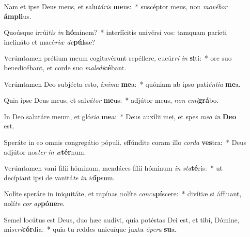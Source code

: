 \item Nam et ipse Deus meus, et salu\textit{tá}\textit{ris} \textbf{me}us:~* suscéptor meus, non \textit{mo}\textit{vé}\textit{bor} \textbf{ám}\textbf{pli}us.
\item Quoúsque irrúi\textit{tis} \textit{in} \textbf{hó}minem?~* interfícitis univérsi vos: tamquam paríeti inclináto et macé\textit{ri}\textit{æ} \textit{de}\textbf{púl}sæ?
\item Verúmtamen prétium meum cogitavérunt repéllere, cucúr\textit{ri} \textit{in} \textbf{si}ti:~* ore suo benedicébant, et corde suo \textit{ma}\textit{le}\textit{di}\textbf{cé}bant.
\item Verúmtamen Deo subjécta esto, á\textit{ni}\textit{ma} \textbf{me}a:~* quóniam ab ipso pati\textit{én}\textit{ti}\textit{a} \textbf{me}a.
\item Quia ipse Deus meus, et sal\textit{vá}\textit{tor} \textbf{me}us:~* adjútor meus, \textit{non} \textit{e}\textit{mi}\textbf{grá}bo.
\item In Deo salutáre meum, et gló\textit{ri}\textit{a} \textbf{me}a:~* Deus auxílii mei, et spes \textit{me}\textit{a} \textit{in} \textbf{De}\textbf{o} est.
\item Speráte in eo omnis congregátio pópuli, effúndite coram illo \textit{cor}\textit{da} \textbf{ves}tra:~* Deus adjútor nos\textit{ter} \textit{in} \textit{æ}\textbf{tér}num.
\item Verúmtamen vani fílii hóminum, mendáces fílii hóminum \textit{in} \textit{sta}\textbf{té}ris:~* ut decípiant ipsi de vanitá\textit{te} \textit{in} \textit{id}\textbf{íp}sum.
\item Nolíte speráre in iniquitáte, et rapínas nolíte \textit{con}\textit{cu}\textbf{pí}scere:~* divítiæ si áffluant, nolí\textit{te} \textit{cor} \textit{ap}\textbf{pó}\textbf{ne}re.
\item Semel locútus est Deus, duo hæc audívi, quia potéstas Dei est, et tibi, Dómine, mi\textit{se}\textit{ri}\textbf{cór}dia:~* quia tu reddes unicuíque juxta \textit{ó}\textit{pe}\textit{ra} \textbf{su}a.

